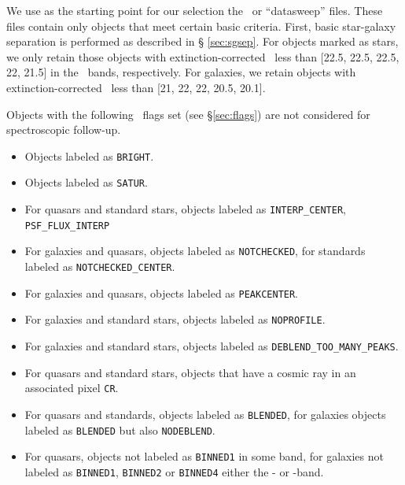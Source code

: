 \documentclass[12pt,preprint]{aastex}
\begin{document}
We use as the starting point for our selection the \calibObj\ or ``datasweep''
files.   These files contain only objects that meet certain basic criteria.
First, basic star-galaxy separation is performed as described in \S
\ref{sec:sgsep}.  For objects marked as stars, we only retain those objects
with extinction-corrected \psfmag\ less than [22.5, 22.5, 22.5, 22, 21.5] in
the \allmag\ bands, respectively.  For galaxies, we retain objects with
extinction-corrected \modelmag\ less than [21, 22, 22, 20.5, 20.1].


Objects with the following \objflags\ flags set (see \S \ref{sec:flags}) are
not considered for spectroscopic follow-up.  

\begin{itemize}

    \item Objects labeled as \texttt{BRIGHT}.
    \item Objects labeled as \texttt{SATUR}.

    \item For quasars and standard stars, objects
        labeled as \texttt{INTERP\_CENTER}, 
        \texttt{PSF\_FLUX\_INTERP}

    \item For galaxies and quasars, objects labeled
        as \texttt{NOTCHECKED}, for standards labeled
        as \texttt{NOTCHECKED\_CENTER}.

    \item For galaxies and quasars, objects labeled as
        \texttt{PEAKCENTER}.

    \item For galaxies and standard stars, objects labeled
        as \texttt{NOPROFILE}.

    \item For galaxies and standard stars, objects labeled as 
        \texttt{DEBLEND\_TOO\_MANY\_PEAKS}.

    \item For quasars and standard stars, objects that have
        a cosmic ray in an associated pixel \texttt{CR}.
    
    \item For quasars and standards, objects labeled
        as \texttt{BLENDED}, for galaxies objects labeled
        as \texttt{BLENDED} but also \texttt{NODEBLEND}.


    \item For quasars, objects not labeled as \texttt{BINNED1} in some band, 
    for galaxies not labeled as \texttt{BINNED1}, \texttt{BINNED2}
    or \texttt{BINNED4} either the \rmag- or \imag-band.
   
\end{itemize}
\end{document}
